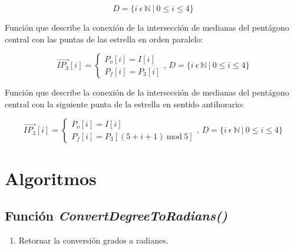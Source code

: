 \documentclass[oneside, a4paper]{article}
\begin{document}
            \begin{equation*}
                D = \{ i \: \epsilon \: \mathbb{N} \: | \: 0 \leqslant i \leqslant 4 \}
            \end{equation*}

            Función que describe la conexión de la intersección de medianas del pentágono central con las puntas de las estrella en orden paralelo:

            \begin{equation}
                \overrightarrow{IP_{3}}[i] =
                \begin{cases}
                    P_{o}[i] = I[i] \\
                    P_{f}[i] = P_{3}[i]
                \end{cases}
                \textrm{, } D = \{ i \: \epsilon \: \mathbb{N} \: | \: 0 \leqslant i \leqslant 4 \}
                \label{eq:union1_median_intersections_vertices_pentagon_star}
            \end{equation}

            Función que describe la conexión de la intersección de medianas del pentágono central con la siguiente punta de la estrella en sentido antihorario:

            \begin{equation}
                \overrightarrow{IP_{3}}[i] =
                \begin{cases}
                    P_{o}[i] = I[i] \\
                    P_{f}[i] = P_{3}[(5 + i + 1) \: \textrm{mod} \: 5]
                \end{cases}
                \textrm{, } D = \{ i \: \epsilon \: \mathbb{N} \: | \: 0 \leqslant i \leqslant 4 \}
                \label{eq:union2_median_intersections_vertices_pentagon_star}
            \end{equation}

    \section{Algoritmos}
        
        \subsection{Función \textit{ConvertDegreeToRadians()}}
            
            \begin{enumerate}
                \item Retornar la conversión grados a radianes.
            \end{enumerate}
\end{document}
